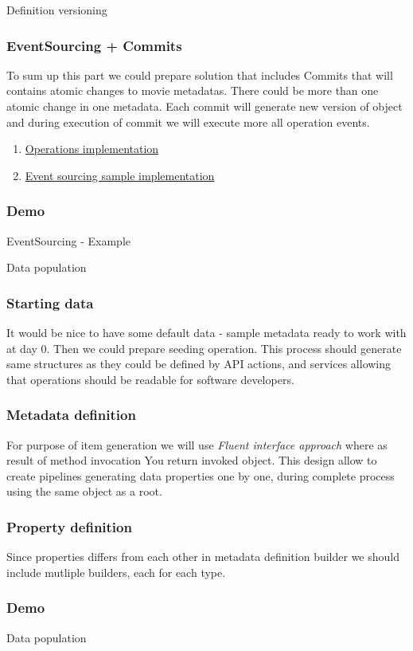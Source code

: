 \documentclass{beamer}
\begin{document}
\begin{section}{Definition versioning}
\begin{frame}
\frametitle{EventSourcing + Commits}
To sum up this part we could prepare solution that includes Commits that will contains atomic changes to movie metadatas. There could be more than one atomic change in one metadata. 
Each commit will generate new version of object and during execution of commit we will execute more all operation events.
\begin{enumerate}
	\item \href{https://github.com/paqaos/DynamicMetadata-SFI2021/tree/main/MovieDatabase/MovieDatabase/Operations}{Operations implementation}
	\item \href{https://github.com/paqaos/DynamicMetadata-SFI2021/tree/main/MovieDatabase/MovieDatabase/Services/EventSourcing}{Event sourcing sample implementation}
\end{enumerate}
\end{frame}

\begin{frame}
\frametitle{Demo}
EventSourcing - Example
\end{frame}
\end{section}

\begin{section}{Data population}
\begin{frame}
\frametitle{Starting data}
It would be nice to have some default data - sample metadata ready to work with at day 0. Then we could prepare seeding operation. This process should generate same structures as they could be defined by API actions, and services allowing that operations should be readable for software developers.
\end{frame}

\begin{frame}
\frametitle{Metadata definition}
For purpose of item generation we will use \textit{Fluent interface approach} where as result of method invocation You return invoked object. This design allow to create pipelines generating data properties one by one, during complete process using the same object as a root.
\end{frame}

\begin{frame}
\frametitle{Property definition}
Since properties differs from each other in metadata definition builder we should include mutliple builders, each for each type. 
\end{frame}

\begin{frame}
\frametitle{Demo}
Data population
\end{frame}

\end{section}
\end{document}
